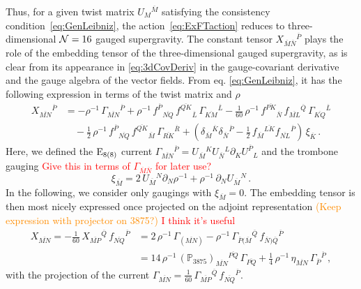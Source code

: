 \documentclass[a4paper, 11pt]{article}
\numberwithin{equation}{section}
\newcommand{\ov}[1]{\overline{#1}}
\newcommand{\+}{\oplus}
\newcommand{\fl}[1]{\ov{#1}}
\newcommand{\EM}[1]{\textcolor{red}{#1}}
\newcommand{\CE}[1]{\textcolor{darkorange}{#1}}
\begin{document}
Thus, for a given twist matrix $U_{M}{}^{\fl{M}}$ satisfying the consistency condition~\eqref{eq:GenLeibniz}, the action~\eqref{eq:ExFTaction} reduces to three-dimensional ${\cal N}=16$ gauged supergravity. The constant tensor $X_{\fl{M}\fl{N}}{}^{\fl{P}}$ plays the role of the embedding tensor of the three-dimensional gauged supergravity, as is clear from its appearance in \eqref{eq:3dCovDeriv} in the gauge-covariant derivative and the gauge algebra of the vector fields. From eq. \eqref{eq:GenLeibniz}, it has the following expression in terms of the twist matrix and $\rho$
\begin{equation}
	\begin{aligned}
		X_{\fl{MN}}{}^{\fl{P}}&=-\rho^{-1}\,\Gamma_{\fl{MN}}{}^{\fl{P}} + \rho^{-1}\,f^{\fl{P}}{}_{\fl{NQ}}\,f^{\fl{QK}}{}_{\fl{L}}\,\Gamma_{\fl{KM}}{}^{\fl{L}}-\frac{1}{60}\,\rho^{-1}\,f^{\fl{PK}}{}_{\fl{N}}\,f_{\fl{ML}}{}^{\fl{Q}}\,\Gamma_{\fl{KQ}}{}^{\fl{L}}\\
		&\quad-\frac{1}{2}\,\rho^{-1}\,f^{\fl{P}}{}_{\fl{NQ}}\,f^{\fl{QK}}{}_{\fl{M}}\,\Gamma_{\fl{RK}}{}^{\fl{R}}+\left(\delta_{\fl{M}}{}^{\fl{K}}\delta_{\fl{N}}{}^{\fl{P}}-\frac{1}{2}\,f_{\fl{M}}{}^{\fl{LK}}f_{\fl{NL}}{}^{\fl{P}}\right)\,\xi_{\fl{K}}\,.
	\end{aligned}
\end{equation}
Here, we defined the ${\rm E}_{8(8)}$ current $\Gamma_{\fl{MN}}{}^{\fl{P}}=U_{\fl{M}}{}^{K}U_{\fl{N}}{}^{L}\partial_{K}U^{\fl{P}}{}_{L}$ and the trombone gauging \EM{Give this in terms of $\Gamma_{\fl{M}\fl{N}}$ for later use?}
\begin{equation} \label{eq:Trombone}
	\xi_{\fl{M}} = 2\,U_{\fl{M}}{}^{N}\partial_{N}\rho^{-1}+\rho^{-1}\,\partial_{N}U_{\fl{M}}{}^{N} \,.
\end{equation}
In the following, we consider only gaugings with $\xi_{\fl{M}}=0$. The embedding tensor is then most nicely expressed once projected on the adjoint representation \CE{(Keep expression with projector on 3875?)} \EM{I think it's useful}
\begin{equation} \label{eq:symembeddingtensor}
	\begin{aligned}
		X_{\fl{MN}} = -\frac{1}{60}\,X_{\fl{MP}}{}^{\fl{Q}}\,f_{\fl{NQ}}{}^{\fl{P}} &= 2\,\rho^{-1}\,\Gamma_{(\fl{MN})} - \rho^{-1}\,\Gamma_{\fl{P}(\fl{M}}{}^{\fl{Q}}\,f_{\fl{N})\fl{Q}}{}^{\fl{P}}\\
		&=14\,\rho^{-1}\,(\mathbb{P}_{3875})_{\fl{MN}}{}^{\fl{PQ}}\,\Gamma_{\fl{PQ}}+\frac{1}{4}\,\rho^{-1}\,\eta_{\fl{MN}}\,\Gamma_{\fl{P}}{}^{\fl{P}} \,,
	\end{aligned}
\end{equation}
with the projection of the current $\Gamma_{\fl{MN}} = \tfrac{1}{60}\,\Gamma_{\fl{MP}}{}^{\fl{Q}}\,f_{\fl{NQ}}{}^{\fl{P}}$.
\end{document}
